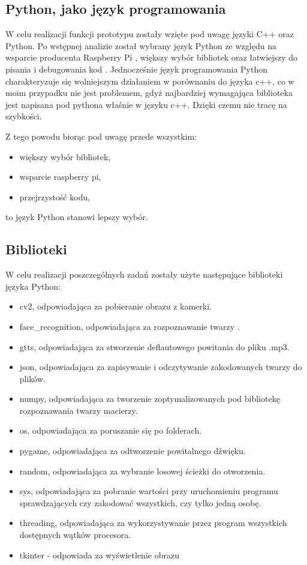 \documentclass[a4paper,12pt,reqno]{article}
\begin{document}
\subsection{Python, jako język programowania}
W celu realizacji funkcji prototypu zostały wzięte pod uwagę języki C++ oraz Python. Po wstępnej analizie został wybrany język Python ze względu na wsparcie producenta Raspberry Pi \cite{watki_jak_pisac}, większy wybór bibliotek \cite{face_detection_and_recognition_using_opencv} oraz łatwiejszy do pisania i debugowania kod \cite{face_recognition_with_python}. Jednocześnie język programowania Python charakteryzuje się wolniejszym działaniem w porównaniu do języka c++, co w moim przypadku nie jest problemem, gdyż najbardziej wymagająca biblioteka jest napisana pod pythona właśnie w języku c++. Dzięki czemu nie tracę na szybkości.

Z tego powodu biorąc pod uwagę przede wszystkim:
\begin{itemize}
\item większy wybór bibliotek,
\item wsparcie raspberry pi,
\item przejrzystość kodu,
\end{itemize}
to język Python stanowi lepszy wybór.
\subsection{Biblioteki}
W celu realizacji poszczególnych zadań zostały użyte następujące biblioteki języka Python:
\begin{itemize}
\item cv2, odpowiadająca za pobieranie obrazu z kamerki.
\item face\_recognition, odpowiadająca za rozpoznawanie twarzy \cite{face_recognition_github} \cite{face_recognition_implementation_on_raspberrypi} \cite{face_recognition_python}.
\item gtts, odpowiadająca za stworzenie deflautowego powitania do pliku .mp3.
\item json, odpowiadająca za zapisywanie i odczytywanie zakodowanych twarzy do plików.
\item numpy, odpowiadająca za tworzenie zoptymalizowanych pod bibliotekę rozpoznawania twarzy macierzy.
\item os, odpowiadająca za poruszanie się po folderach.
\item pygame, odpowiadająca za odtworzenie powitalnego dźwięku.
\item random, odpowiadająca za wybranie losowej ścieżki do otworzenia.
\item sys, odpowiadająca za pobranie wartości przy uruchomieniu programu sprawdzających czy zakodować wszystkich, czy tylko jedną osobę.
\item threading, odpowiadająca za wykorzystywanie przez program wszystkich dostępnych wątków procesora.
\item tkinter - odpowiada za wyświetlenie obrazu
\end{itemize}
\end{document}
